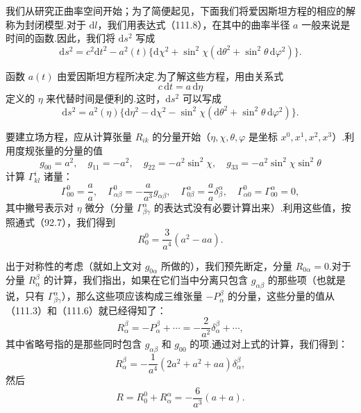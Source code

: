 我们从研究正曲率空间开始；为了简便起见，下面我们将爱因斯坦方程的相应的解称为封闭模型.对于 $\mathrm{d}l$，我们用表达式（111.8），在其中的曲率半径 $a$ 一般来说是时间的函数.因此，我们将 $\mathrm{d}s^{2}$ 写成
\begin{equation}
  \mathrm{d}s^{2}=c^{2}\mathrm{d}t^{2}
  -a^{2}(t)\{\mathrm{d}\chi^{2}
  +\sin^{2}\chi(\mathrm{d}\theta^{2}+\sin^{2}\theta\,\mathrm{d}\varphi^{2})\}.
\end{equation}

函数 $a(t)$ 由爱因斯坦方程所决定.为了解这些方程，用由关系式
\begin{equation}
  c\,\mathrm{d}t=a\,\mathrm{d}\eta
\end{equation}
定义的 $\eta$ 来代替时间是便利的.这时，$\mathrm{d}s^{2}$ 可以写成
\begin{equation}
  \mathrm{d}s^{2}=a^{2}(\eta)\{\mathrm{d}\eta^{2}-\mathrm{d}\chi^{2}
  -\sin^{2}\chi(\mathrm{d}\theta^{2}+\sin^{2}\theta\,\mathrm{d}\varphi^{2})\}.
\end{equation}

要建立场方程，应从计算张量 $R_{ik}$ 的分量开始（$\eta,\chi,\theta,\varphi$ 是坐标 $x^{0},x^{1},x^{2},x^{3}$）.利用度规张量的分量的值
\begin{equation*}
  g_{00}=a^{2},\quad g_{11}=-a^{2},\quad
  g_{22}=-a^{2}\sin^{2}\chi,\quad
  g_{33}=-a^{2}\sin^{2}\chi\sin^{2}\theta
\end{equation*}
计算 $\Gamma_{kl}^{i}$ 诸量：
\begin{equation*}
  \Gamma_{00}^{0}=\frac{a}{a},\quad
  \Gamma_{\alpha\beta}^{0}=-\frac{a}{a^{3}}g_{\alpha\beta},\quad
  \Gamma_{0\beta}^{\alpha}=\frac{a}{a}\delta_{\beta}^{\alpha},\quad
  \Gamma_{\alpha 0}^{0}=\Gamma_{00}^{\alpha}=0,
\end{equation*}
其中撇号表示对 $\eta$ 微分（分量 $\Gamma_{\beta\gamma}^{\alpha}$ 的表达式没有必要计算出来）.利用这些值，按照通式（92.7），我们得到
\begin{equation*}
  R_{0}^{0}=\frac{3}{a^{4}}(a^{2}-aa).
\end{equation*}

出于对称性的考虑（就如上文对 $g_{0\alpha}$ 所做的），我们预先断定，分量 $R_{0\alpha}=0$.对于分量 $R_{\alpha}^{\beta}$ 的计算，我们指出，如果在它们当中分离只包含 $g_{\alpha\beta}$ 的那些项（也就是说，只有 $\Gamma_{\beta\gamma}^{\alpha}$），那么这些项应该构成三维张量 $-P_{\alpha}^{\beta}$ 的分量，这些分量的值从（111.3）和（111.6）就已经得知了：
\begin{equation*}
  R_{\alpha}^{\beta}=-P_{\alpha}^{\beta}+\cdots
  =-\frac{2}{a^{2}}\delta_{\alpha}^{\beta}+\cdots,
\end{equation*}
其中省略号指的是那些同时包含 $g_{\alpha\beta}$ 和 $g_{00}$ 的项.通过对上式的计算，我们得到：
\begin{equation*}
  R_{\alpha}^{\beta}
  =-\frac{1}{a^{4}}(2a^{2}+a^{2}+aa)\delta_{\alpha}^{\beta},
\end{equation*}
然后
\begin{equation*}
  R=R_{0}^{0}+R_{\alpha}^{\alpha}
  =-\frac{6}{a^{3}}(a+a).
\end{equation*}

